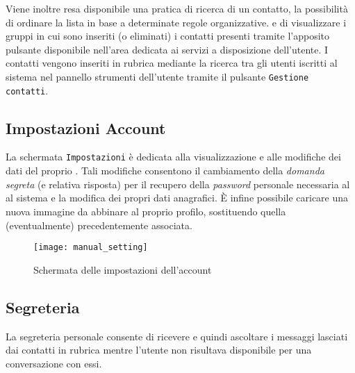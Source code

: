 Viene inoltre resa disponibile una pratica  di ricerca di un contatto, la possibilità di ordinare la lista in base a determinate regole organizzative. e di visualizzare i gruppi in cui sono inseriti (o eliminati) i contatti presenti tramite l'apposito pulsante disponibile nell'area dedicata ai servizi a disposizione dell'utente.
I contatti vengono inseriti in rubrica mediante la ricerca tra gli utenti iscritti al sistema nel pannello strumenti dell'utente tramite il pulsante \texttt{Gestione contatti}.

\subsection{Impostazioni Account}
La schermata \texttt{Impostazioni} è dedicata alla visualizzazione e alle modifiche dei dati del proprio . Tali modifiche consentono il cambiamento della \textit{domanda segreta} (e relativa risposta) per il recupero della \textit{password} personale necessaria al \underline{} al sistema e la modifica dei propri dati anagrafici.
È infine possibile caricare una nuova immagine da abbinare al proprio profilo, sostituendo quella (eventualmente) precedentemente associata.


\begin{figure}[H]
  \texttt{[image: manual\_setting]}
\caption{Schermata delle impostazioni dell'account}\label{fig:setting}
\end{figure}

 
\subsection{Segreteria}
La segreteria personale consente di ricevere e quindi ascoltare i messaggi lasciati dai contatti in rubrica mentre l'utente non risultava disponibile per una conversazione con essi.

